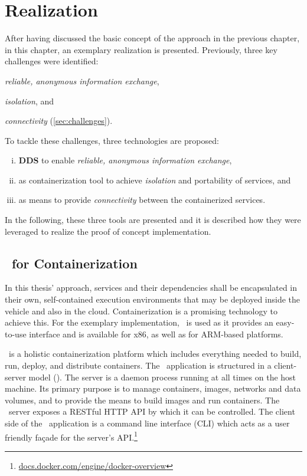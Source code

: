 \chapter{Realization} \label{chapter:realization}
After having discussed the basic concept of the approach in the previous chapter, in this chapter, an exemplary realization is presented. Previously, three key challenges were identified:
\begin{inparaenum}[(i)]
  \item \emph{reliable, anonymous information exchange},
  \item \emph{isolation}, and
  \item \emph{connectivity} (\cf \ref{sec:challenges}).
\end{inparaenum}
To tackle these challenges, three technologies are proposed:

\begin{enumerate}[(i)]
\item \textbf{DDS} to enable \emph{reliable, anonymous information exchange},
\item \textbf{\docker} as containerization tool to achieve \emph{isolation} and portability of services, and
\item \textbf{\wnet} as means to provide \emph{connectivity} between the containerized services.
\end{enumerate}

In the following, these three tools are presented and it is described how they were leveraged to realize the proof of concept implementation.




%
%
%
%
%
%
%
%
%
%

\section{\docker\ for Containerization}
In this thesis' approach, services and their dependencies shall be encapsulated in their own, self-contained execution environments that may be deployed inside the vehicle and also in the cloud. Containerization is a promising technology to achieve this. For the exemplary implementation, \docker\ is used as it provides an easy-to-use interface and is available for x86, as well as for ARM-based platforms.

\docker\ is a holistic containerization platform which includes everything needed to build, run, deploy, and distribute containers. The \docker\ application is structured in a client-server model (\cf {}). The server is a daemon process running at all times on the host machine. Its primary purpose is to manage containers, images, networks and data volumes, and to provide the means to  build images and run containers. The \docker\ server exposes a RESTful HTTP API by which it can be controlled. The client side of the \docker\ application is a command line interface (CLI) which acts as a user friendly façade for the server's API.\footnote{\url{docs.docker.com/engine/docker-overview}}

